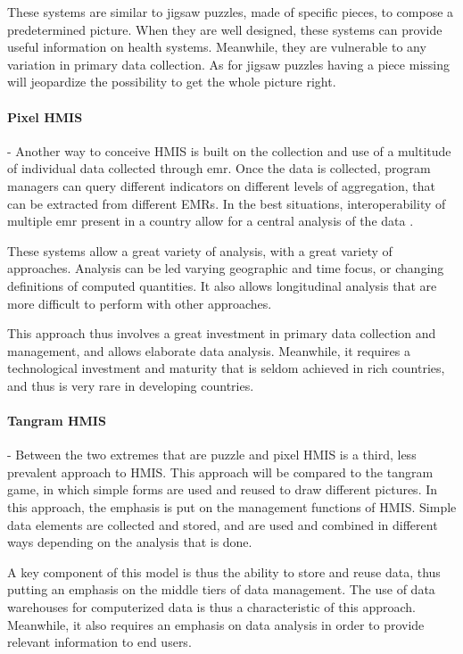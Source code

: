 These systems are similar to jigsaw puzzles, made of specific pieces, to compose a predetermined picture. When they are well designed, these systems can provide useful information on health systems. Meanwhile, they are vulnerable to any variation in primary data collection. As for jigsaw puzzles having a piece missing will jeopardize the possibility to get the whole picture right.

\paragraph{Pixel HMIS} - Another way to conceive HMIS is built on the collection and use of a multitude of individual data collected through  \gls*{emr}. Once the data is collected, program managers can query different indicators on different levels of aggregation, that can be extracted from different EMRs. In the best situations, interoperability of multiple  \gls*{emr} present in a country allow for a central analysis of the data \cite{pugliese2009large}.

These systems allow a great variety of analysis, with a great variety of approaches. Analysis can be led varying geographic and time focus, or changing definitions of computed quantities. It also allows longitudinal analysis that are more difficult to perform with other approaches.

This approach thus involves a great investment in primary data collection and management, and allows elaborate data analysis. Meanwhile, it requires a technological investment and maturity that is seldom achieved in rich countries, and thus is very rare in developing countries.

\paragraph{Tangram HMIS} - Between the two extremes that are puzzle and pixel HMIS is a third, less prevalent approach to HMIS. This approach will be compared to the tangram game, in which simple forms are used and reused to draw different pictures. In this approach, the emphasis is put on the management functions of HMIS. Simple data elements are collected and stored, and are used and combined in different ways depending on the analysis that is done.

A key component of this model is thus the ability to store and reuse data, thus putting an emphasis on the middle tiers of data management. The use of data warehouses for computerized data is thus a characteristic of this approach. Meanwhile, it also requires an emphasis on data analysis in order to provide relevant information to end users.

